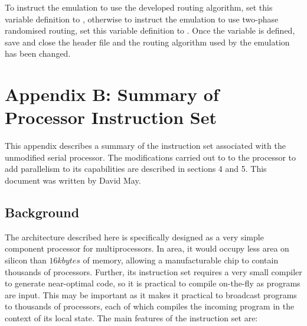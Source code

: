 \documentclass[a4paper, 12pt]{article}
\begin{document}
\noindent To instruct the emulation to use the developed routing algorithm, set this variable definition to {}, otherwise to instruct the emulation to use two-phase randomised routing, set this variable definition to {}. Once the variable is defined, save and close the header file and the routing algorithm used by the emulation has been changed.

\newpage
\section*{Appendix B: Summary of Processor Instruction Set}

This appendix describes a summary of the instruction set associated with the unmodified serial processor. The modifications carried out to to the processor to add parallelism to its capabilities are described in sections 4 and 5. This document was written by David May.

\subsection*{Background}
\setlength{\parindent}{0in}

The architecture described here is specifically designed as a very
simple component processor for multiprocessors. In area, it 
would occupy less area on silicon than $16kbytes$ of memory,
allowing a manufacturable chip to contain thousands 
of  processors.
Further, its instruction set requires a very small compiler to
generate near-optimal code, so it is practical to compile 
on-the-fly as programs are input. This may be important 
as it makes it practical to broadcast programs to 
thousands of processors, each of which compiles the
incoming program in the context of its local state. The main
features of the instruction set are: 
\end{document}
